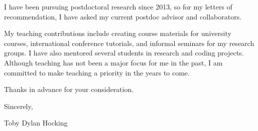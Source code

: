 \documentclass{article}
\begin{document}

I have been pursuing postdoctoral research since 2013, so for my
letters of recommendation, I have asked my current postdoc advisor and
collaborators.

My teaching contributions include creating course materials for
university courses, international conference tutorials, and informal
seminars for my research groups. I have also mentored several students
in research and coding projects. Although teaching has not been a
major focus for me in the past, I am committed to make teaching a
priority in the years to come.



Thanks in advance for your consideration.

Sincerely,


Toby Dylan Hocking
\end{document}
